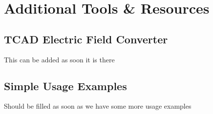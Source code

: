 \section{Additional Tools \& Resources}
\subsection{TCAD Electric Field Converter}
\todo This can be added as soon it is there \todo
\subsection{Simple Usage Examples}
\todo Should be filled as soon as we have some more usage examples \todo
